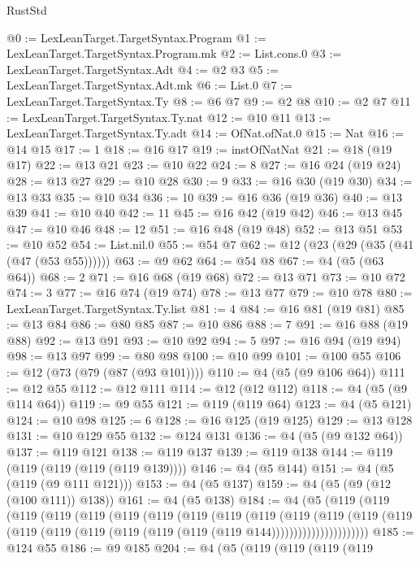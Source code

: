 \begin{lexlean}{RustStd}
\begin{coremodule}
@0 := LexLeanTarget.TargetSyntax.Program
@1 := LexLeanTarget.TargetSyntax.Program.mk
@2 := List.cons.{0}
@3 := LexLeanTarget.TargetSyntax.Adt
@4 := @2 @3
@5 := LexLeanTarget.TargetSyntax.Adt.mk
@6 := List.{0}
@7 := LexLeanTarget.TargetSyntax.Ty
@8 := @6 @7
@9 := @2 @8
@10 := @2 @7
@11 := LexLeanTarget.TargetSyntax.Ty.nat
@12 := @10 @11
@13 := LexLeanTarget.TargetSyntax.Ty.adt
@14 := OfNat.ofNat.{0}
@15 := Nat
@16 := @14 @15
@17 := 1
@18 := @16 @17
@19 := instOfNatNat
@21 := @18 (@19 @17)
@22 := @13 @21
@23 := @10 @22
@24 := 8
@27 := @16 @24 (@19 @24)
@28 := @13 @27
@29 := @10 @28
@30 := 9
@33 := @16 @30 (@19 @30)
@34 := @13 @33
@35 := @10 @34
@36 := 10
@39 := @16 @36 (@19 @36)
@40 := @13 @39
@41 := @10 @40
@42 := 11
@45 := @16 @42 (@19 @42)
@46 := @13 @45
@47 := @10 @46
@48 := 12
@51 := @16 @48 (@19 @48)
@52 := @13 @51
@53 := @10 @52
@54 := List.nil.{0}
@55 := @54 @7
@62 := @12 (@23 (@29 (@35 (@41 (@47 (@53 @55))))))
@63 := @9 @62
@64 := @54 @8
@67 := @4 (@5 (@63 @64))
@68 := 2
@71 := @16 @68 (@19 @68)
@72 := @13 @71
@73 := @10 @72
@74 := 3
@77 := @16 @74 (@19 @74)
@78 := @13 @77
@79 := @10 @78
@80 := LexLeanTarget.TargetSyntax.Ty.list
@81 := 4
@84 := @16 @81 (@19 @81)
@85 := @13 @84
@86 := @80 @85
@87 := @10 @86
@88 := 7
@91 := @16 @88 (@19 @88)
@92 := @13 @91
@93 := @10 @92
@94 := 5
@97 := @16 @94 (@19 @94)
@98 := @13 @97
@99 := @80 @98
@100 := @10 @99
@101 := @100 @55
@106 := @12 (@73 (@79 (@87 (@93 @101))))
@110 := @4 (@5 (@9 @106 @64))
@111 := @12 @55
@112 := @12 @111
@114 := @12 (@12 @112)
@118 := @4 (@5 (@9 @114 @64))
@119 := @9 @55
@121 := @119 (@119 @64)
@123 := @4 (@5 @121)
@124 := @10 @98
@125 := 6
@128 := @16 @125 (@19 @125)
@129 := @13 @128
@131 := @10 @129 @55
@132 := @124 @131
@136 := @4 (@5 (@9 @132 @64))
@137 := @119 @121
@138 := @119 @137
@139 := @119 @138
@144 := @119 (@119 (@119 (@119 (@119 @139))))
@146 := @4 (@5 @144)
@151 := @4 (@5 (@119 (@9 @111 @121)))
@153 := @4 (@5 @137)
@159 := @4 (@5 (@9 (@12 (@100 @111)) @138))
@161 := @4 (@5 @138)
@184 := @4
    (@5
      (@119
        (@119
          (@119
            (@119
              (@119
                (@119
                  (@119
                    (@119
                      (@119
                        (@119
                          (@119
                            (@119
                              (@119
                                (@119
                                  (@119
                                    (@119 (@119 (@119 (@119 (@119 (@119 @144))))))))))))))))))))))
@185 := @124 @55
@186 := @9 @185
@204 := @4
    (@5
      (@119
        (@119
          (@119
            (@119

\end{coremodule}
\end{lexlean}
